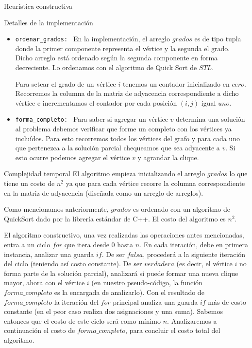 \begin{section}{Heurística constructiva}
\begin{subsection}{Detalles de la implementación}
			\begin{itemize}
				\item \texttt{ordenar\_grados: } En la implementación, el arreglo $grados$ es de tipo tupla donde la primer componente representa el vértice y la segunda el grado. Dicho arreglo está ordenado según la segunda componente en forma decreciente. Lo ordenamos con el algoritmo de Quick Sort de $STL$.
				
				Para setear el grado de un vértice $i$ tenemos un contador inicializado en $cero$. Recorremos la columna de la matriz de adyacencia correspondiente a dicho vértice e incrementamos el contador por cada posición $(i,j)$ igual $uno$.
				\item \texttt{forma\_completo: } Para saber si agregar un vértice $v$ determina una solución al problema debemos verificar que forme un completo con los vértices ya incluídos. Para esto recorremos todos los vértices del grafo y para cada uno que pertenezca a la solución parcial chequeamos que sea adyacente a $v$. Si esto ocurre podemos agregar el vértice $v$ y agrandar la clique.
			\end{itemize}
		\end{subsection}
		\begin{subsection}{Complejidad temporal}
			El algoritmo empieza inicializando el arreglo $grados$ lo que tiene un costo de $n^2$ ya que para cada vértice recorre la columna correspondiente en la matriz de adyacencia (diseñada como un arreglo de arreglos).
			
			Como mencionamos anteriormente, $grados$ es ordenado con un algoritmo de QuickSort dado por la librería estándar de C++. El costo del algoritmo es $n^2$.
			
			El algoritmo constructivo, una vez realizadas las operaciones antes mencionadas, entra a un ciclo $for$ que itera desde $0$ hasta $n$. En cada iteración, debe en primera instancia, analizar una guarda $if$. De ser $falsa$, procederá a la siguiente iteración del ciclo (teniendo así costo constante). De ser $verdadera$ (es decir, el vértice $i$ no forma parte de la solución parcial), analizará si puede formar una nueva clique mayor, ahora con el vértice $i$ (en nuestro pseudo-código, la función $forma\_completo$ es la encargada de analizarlo). Con el resultado de $forma\_completo$ la iteración del $for$ principal analiza una guarda $if$ más de costo constante (en el peor caso realiza dos asignaciones y una suma). Sabemos entonces que el costo de este ciclo será como mínimo $n$. Analizaremos a continuación el costo de $forma\_completo$, para concluir el costo total del algoritmo.
			

\end{subsection}
\end{section}
